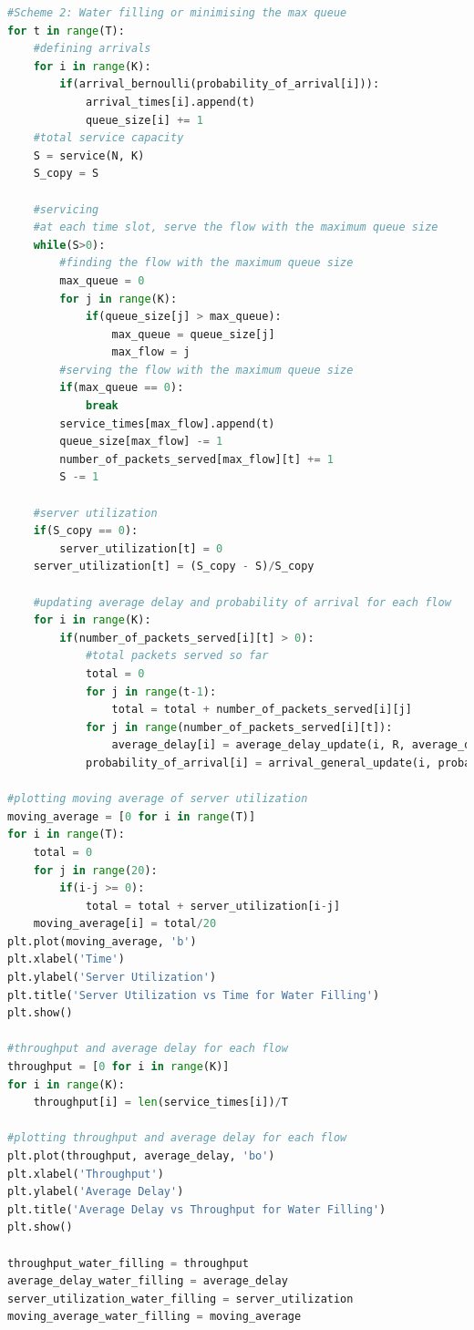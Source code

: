 \documentclass[11pt, a4paper]{article}
\begin{document}
\begin{lstlisting}[language=Python]
#Scheme 2: Water filling or minimising the max queue
for t in range(T):
    #defining arrivals
    for i in range(K):
        if(arrival_bernoulli(probability_of_arrival[i])):
            arrival_times[i].append(t)
            queue_size[i] += 1
    #total service capacity
    S = service(N, K)
    S_copy = S

    #servicing
    #at each time slot, serve the flow with the maximum queue size
    while(S>0):
        #finding the flow with the maximum queue size
        max_queue = 0
        for j in range(K):
            if(queue_size[j] > max_queue):
                max_queue = queue_size[j]
                max_flow = j
        #serving the flow with the maximum queue size
        if(max_queue == 0):
            break
        service_times[max_flow].append(t)
        queue_size[max_flow] -= 1
        number_of_packets_served[max_flow][t] += 1
        S -= 1

    #server utilization
    if(S_copy == 0):
        server_utilization[t] = 0
    server_utilization[t] = (S_copy - S)/S_copy

    #updating average delay and probability of arrival for each flow
    for i in range(K):
        if(number_of_packets_served[i][t] > 0):
            #total packets served so far
            total = 0
            for j in range(t-1):
                total = total + number_of_packets_served[i][j]
            for j in range(number_of_packets_served[i][t]):
                average_delay[i] = average_delay_update(i, R, average_delay[i], t - arrival_times[i][total + j], total+j)
            probability_of_arrival[i] = arrival_general_update(i, probability_of_arrival[i], total, t, average_delay[i], R, arrival_times[i], service_times[i], 0.01)

#plotting moving average of server utilization
moving_average = [0 for i in range(T)]
for i in range(T):
    total = 0
    for j in range(20):
        if(i-j >= 0):
            total = total + server_utilization[i-j]
    moving_average[i] = total/20
plt.plot(moving_average, 'b')
plt.xlabel('Time')
plt.ylabel('Server Utilization')
plt.title('Server Utilization vs Time for Water Filling')
plt.show()

#throughput and average delay for each flow
throughput = [0 for i in range(K)]
for i in range(K):
    throughput[i] = len(service_times[i])/T

#plotting throughput and average delay for each flow
plt.plot(throughput, average_delay, 'bo')
plt.xlabel('Throughput')
plt.ylabel('Average Delay')
plt.title('Average Delay vs Throughput for Water Filling')
plt.show()

throughput_water_filling = throughput
average_delay_water_filling = average_delay
server_utilization_water_filling = server_utilization
moving_average_water_filling = moving_average

\end{lstlisting}
\end{document}
